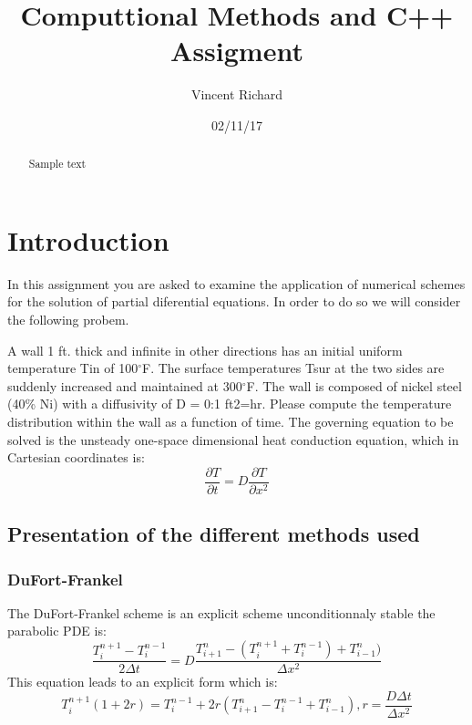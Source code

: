 \documentclass [10 pt, a4 paper]{article}
\author{Vincent Richard}
\date{02/11/17}
\title{Computtional Methods and C++ Assigment}
\begin{document}
\begin{titlepage}
    \maketitle
\end{titlepage}
\newpage

\begin{abstract}
    Sample text
\end{abstract}

\tableofcontents
\listoffigures
\listoftables
\newpage


\section{Introduction}
In this assignment you are asked to examine the application of numerical schemes
for the solution of partial diferential equations. In order to  do so we will consider 
the following probem.

A wall 1 ft. thick and infinite in other directions has an initial uniform temperature Tin of 100$^{\circ}$F. The surface temperatures Tsur at the two
sides are suddenly increased and maintained at 300$^{\circ}$F. The wall is composed of
nickel steel (40\% Ni) with a diffusivity of D = 0:1 ft2=hr. Please compute the
temperature distribution within the wall as a function of time.
The governing equation to be solved is the unsteady one-space dimensional
heat conduction equation, which in Cartesian coordinates is:
\begin{equation}
    \frac{\partial T}{\partial t} = D \frac{\partial T}{\partial x^{2}}
\end{equation}

\subsection{Presentation of the different methods used}

\subsubsection{DuFort-Frankel}
The DuFort-Frankel scheme is an explicit scheme unconditionnaly stable the parabolic PDE is:
\begin{equation}
    \frac{T_{i}^{n+1} - T_{i}^{n-1}}{2\Delta t} = D \frac{T_{i+1}^{n} -(T_{i}^{n+1} + T_{i}^{n-1}) + T_{i-1}^{n})}{\Delta x^{2}}
\end{equation}
This equation leads to an explicit form which is:
\begin{equation}
    T_{i}^{n+1}(1 + 2r) = T_{i}^{n-1} +2r(T_{i+1}^{n} - T_{i}^{n-1} + T_{i-1}^{n}), r =\frac{D\Delta t}{\Delta x^{2}}
\end{equation}
\end{document}
